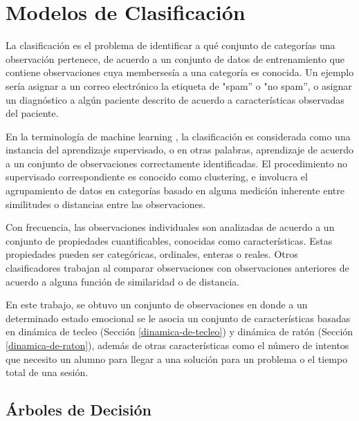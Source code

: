 
\chapter{Modelos de Clasificación}

La clasificación es el problema de identificar a qué conjunto de
categorías una observación pertenece, de acuerdo a un conjunto de
datos de entrenamiento que contiene observaciones cuya membersesía a
una categoría es conocida. Un ejemplo sería asignar a un correo
electrónico la etiqueta de "spam'' o "no spam'', o asignar un
diagnóstico a algún paciente descrito de acuerdo a características
observadas del paciente.

En la terminología de machine learning
\cite{alpaydin2004introduction}, la clasificación es considerada como
una instancia del aprendizaje supervisado, o en otras palabras,
aprendizaje de acuerdo a un conjunto de observaciones correctamente
identificadas. El procedimiento no supervisado correspondiente es
conocido como clustering, e involucra el agrupamiento de datos en
categorías basado en alguna medición inherente entre similitudes o
distancias entre las observaciones.

Con frecuencia, las observaciones individuales son analizadas de
acuerdo a un conjunto de propiedades cuantificables, conocidas como
características. Estas propiedades pueden ser categóricas, ordinales,
enteras o reales. Otros clasificadores trabajan al comparar
observaciones con observaciones anteriores de acuerdo a alguna función
de similaridad o de distancia.

En este trabajo, se obtuvo un conjunto de observaciones en donde a un
determinado estado emocional se le asocia un conjunto de
características basadas en dinámica de tecleo (Sección
\ref{dinamica-de-tecleo}) y dinámica de ratón (Sección
\ref{dinamica-de-raton}), además de otras características como el
número de intentos que necesito un alumno para llegar a una solución
para un problema o el tiempo total de una sesión.

\section{Árboles de Decisión}
\label{j48}


